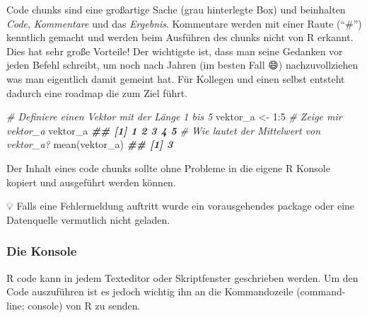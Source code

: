 \documentclass[
]{article}
\newenvironment{Shaded}{\begin{snugshade}}{\end{snugshade}}
\newcommand{\CommentTok}[1]{\textcolor[rgb]{0.56,0.35,0.01}{\textit{#1}}}
\newcommand{\DecValTok}[1]{\textcolor[rgb]{0.00,0.00,0.81}{#1}}
\newcommand{\DocumentationTok}[1]{\textcolor[rgb]{0.56,0.35,0.01}{\textbf{\textit{#1}}}}
\newcommand{\FunctionTok}[1]{\textcolor[rgb]{0.00,0.00,0.00}{#1}}
\newcommand{\NormalTok}[1]{#1}
\newcommand{\OtherTok}[1]{\textcolor[rgb]{0.56,0.35,0.01}{#1}}
\newcommand{\SpecialCharTok}[1]{\textcolor[rgb]{0.00,0.00,0.00}{#1}}
\begin{document}
Code chunks sind eine großartige Sache (grau hinterlegte Box) und beinhalten \emph{Code}, \emph{Kommentare} und das \emph{Ergebnis}. Kommentare werden mit einer Raute (``\#'') kenntlich gemacht und werden beim Ausführen des chunks nicht von R erkannt. Dies hat sehr große Vorteile! Der wichtigste ist, dass man seine Gedanken vor jeden Befehl schreibt, um noch nach Jahren (im besten Fall 😄) nachzuvollziehen was man eigentlich damit gemeint hat. Für Kollegen und einen selbst entsteht dadurch eine roadmap die zum Ziel führt.

\begin{Shaded}
\begin{Highlighting}[]
\CommentTok{\# Definiere einen Vektor mit der Länge 1 bis 5 }
\NormalTok{vektor\_a }\OtherTok{\textless{}{-}} \DecValTok{1}\SpecialCharTok{:}\DecValTok{5}
\CommentTok{\# Zeige mir vektor\_a}
\NormalTok{vektor\_a}
\DocumentationTok{\#\# [1] 1 2 3 4 5}
\CommentTok{\# Wie lautet der Mittelwert von vektor\_a?}
\FunctionTok{mean}\NormalTok{(vektor\_a)}
\DocumentationTok{\#\# [1] 3}
\end{Highlighting}
\end{Shaded}

Der Inhalt eines code chunks sollte ohne Probleme in die eigene R Konsole kopiert und ausgeführt werden können.

💡 Falls eine Fehlermeldung auftritt wurde ein vorausgehendes package oder eine Datenquelle vermutlich nicht geladen.

\hypertarget{die-konsole}{%
\subsubsection{Die Konsole}\label{die-konsole}}

R code kann in jedem Texteditor oder Skriptfenster geschrieben werden. Um den Code auszuführen ist es jedoch wichtig ihn an die Kommandozeile (command-line; console) von R zu senden.
\end{document}
